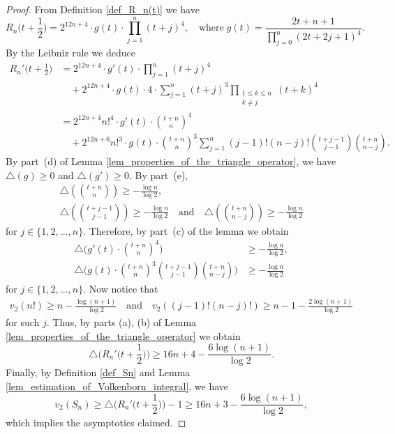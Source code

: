 \documentclass[12pt]{article}
\let\le\leqslant
\let\ge\geqslant
\theoremstyle{remark}
\numberwithin{equation}{section}
\begin{document}
\begin{proof}
From Definition \ref{def_R_n(t)} we have
\[
R_n\Big( t+\frac{1}{2} \Big) = 2^{12n+4} \cdot g(t) \cdot \prod_{j=1}^{n} \left( t+j \right)^4,
\quad\text{where}\;
g(t) = \frac{2t+n+1}{\prod_{j=0}^{n} \left( 2t+2j+1 \right)^4}.
\]
By the Leibniz rule we deduce
\begin{align*}
R_n'\Big( t+\frac{1}{2} \Big)
&= 2^{12n+4}  \cdot g'(t) \cdot \prod_{j=1}^{n} ( t+j)^4 \\
&\quad
+ 2^{12n+4}  \cdot g(t) \cdot 4 \cdot \sum_{j=1}^{n} (t+j)^3 \prod_{\substack{1 \le k \le n\\ k \ne j}} (t+k)^4 \\
&=2^{12n+4} n!^4 \cdot g'(t) \cdot \binom{t+n}{n}^4 \\
&\quad
+ 2^{12n+6} n!^3 \cdot g(t) \cdot \binom{t+n}{n}^3 \sum_{j=1}^{n} (j-1)! (n-j)! \binom{t+j-1}{j-1} \binom{t+n}{n-j}.
\end{align*}
By part~(d) of Lemma \ref{lem_properties_of_the_triangle_operator}, we have $\triangle(g) \ge 0$ and $\triangle(g') \ge 0$. 
By part~(e),
\begin{gather*}
\triangle\left( \binom{t+n}{n} \right) \ge -\frac{\log n}{\log 2}, \\
\triangle\left( \binom{t+j-1}{j-1} \right) \ge -\frac{\log n}{\log 2} \quad\text{and}\quad
\triangle\left( \binom{t+n}{n-j} \right) \ge -\frac{\log n}{\log 2}
\end{gather*}
for $j \in \{1,2,\dots,n\}$. 
Therefore, by part~(c) of the lemma we obtain
\begin{align*}
\triangle\bigg( g'(t) \cdot \binom{t+n}{n}^4 \bigg) &\ge -\frac{\log n}{\log 2}, \\
\triangle\bigg( g(t) \cdot \binom{t+n}{n}^3\binom{t+j-1}{j-1} \binom{t+n}{n-j}  \bigg) &\ge -\frac{\log n}{\log 2}
\end{align*}
for $j \in \{1,2,\dots,n\}$. 
Now notice that
\begin{align*}
v_2(n!) \ge n - \frac{\log (n+1)}{\log 2} \quad\text{and}\quad
v_2((j-1)!(n-j)!) \ge n - 1 - \frac{2 \log (n+1)}{\log 2}
\end{align*}
for such $j$. 
Thus, by parts (a), (b) of Lemma \ref{lem_properties_of_the_triangle_operator} we obtain
\[
\triangle\Big( R_n'\Big( t+\frac{1}{2} \Big) \Big) \ge 16n + 4 - \frac{6\log(n+1)}{\log 2}.
\]
Finally, by Definition \ref{def_Sn} and Lemma \ref{lem_estimation_of_Volkenborn_integral}, we have
\[
v_2(S_n) \ge \triangle\Big( R_n'\Big( t+\frac{1}{2} \Big) \Big) - 1
\ge 16n + 3  -\frac{6\log(n+1)}{\log 2},
\]
which implies the asymptotics claimed.
\end{proof}
\end{document}
